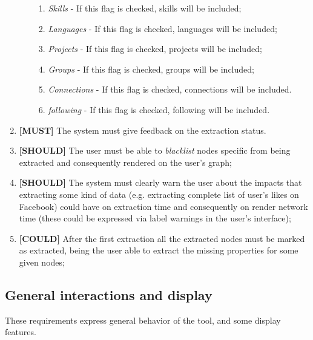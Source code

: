 \begin{enumerate}
\begin{enumerate}
\begin{enumerate}
            \item \textit{Skills} - If this flag is checked, skills will be included;
            \item \textit{Languages} - If this flag is checked, languages will be included;
            \item \textit{Projects} - If this flag is checked, projects will be included;
            \item \textit{Groups} - If this flag is checked, groups will be included;
            \item \textit{Connections} - If this flag is checked, connections will be included.
            \item \textit{following} - If this flag is checked, following will be included.
        \end{enumerate}
    \end{enumerate}
    \item \textbf{[MUST]} The system must give feedback on the extraction status.
    \item \textbf{[SHOULD]} The user must be able to \textit{blacklist} nodes specific from being extracted and consequently rendered on the user's graph;
    \item \textbf{[SHOULD]} The system must clearly warn the user about the impacts that extracting some kind of data (e.g. extracting complete list of user's likes on Facebook)
    could have on extraction time and consequently on render network time (these could be expressed via label warnings in the user's interface);
    \item \textbf{[COULD]} After the first extraction all the extracted nodes must be marked as extracted, being the user able to extract the missing properties for some given nodes;
\end{enumerate}

\subsection{General interactions and display}

These requirements express general behavior of the tool, and some display features.

